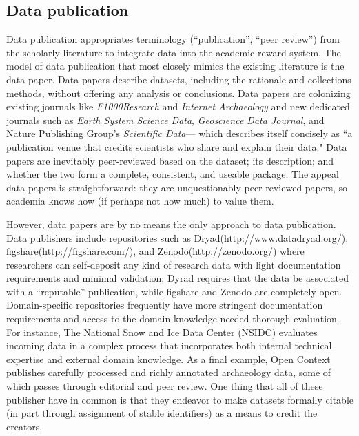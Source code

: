 \documentclass[10pt]{article}
\begin{document}
\subsection*{Data publication}
 
Data publication appropriates terminology (``publication'', ``peer review'') from the scholarly literature to integrate data into the academic reward system\cite{costello_motivating_2009, lawrence_data_2011, atici_other_2012}.
The model of data publication that most closely mimics the existing literature is the data paper.
Data papers describe datasets, including the rationale and collections methods, without offering any analysis or conclusions\cite{newman_data_2009, callaghan_processes_2013}.
Data papers are colonizing existing journals like \emph{F1000Research} and \emph{Internet Archaeology} and new dedicated journals such as \emph{Earth System Science Data}, \emph{Geoscience Data Journal}\cite{allan_geoscience_2014}, and Nature Publishing Group's \emph{Scientific Data}--- which describes itself concisely as ``a publication venue that credits scientists who share and explain their data." \cite{editors_more_2014}
Data papers are inevitably peer-reviewed based on the dataset; its description; and whether the two form a complete, consistent, and useable package\cite{lawrence_data_2011}.
The appeal data papers is straightforward: they are unquestionably peer-reviewed papers, so academia knows how (if perhaps not how much) to value them.

However, data papers are by no means the only approach to data publication.
Data publishers include repositories such as Dryad(http://www.datadryad.org/), figshare(http://figshare.com/), and Zenodo(http://zenodo.org/) where researchers can self-deposit any kind of research data with light documentation requirements and minimal validation; Dyrad requires that the data be associated with a ``reputable'' publication, while figshare and Zenodo are completely open.
Domain-specific repositories frequently have more stringent documentation requirements and access to the domain knowledge needed thorough evaluation.
For instance, The National Snow and Ice Data Center (NSIDC) evaluates incoming data in a complex process that incorporates both internal technical expertise and external domain knowledge\cite{weaver_data_2012}.
As a final example, Open Context publishes carefully processed and richly annotated archaeology data, some of which passes through editorial and peer review\cite{kansa_we_2013}.
One thing that all of these publisher have in common is that they endeavor to make datasets formally citable (in part through assignment of stable identifiers) as a means to credit the creators.
\end{document}
